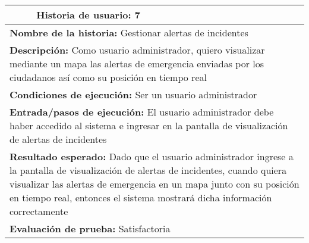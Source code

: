 \begin{longtable}{|p{6.7cm}|p{6.7cm}|}
    \hline
    \endlastfoot
    \multicolumn{1}{|p{6.7cm}|}{\textbf{Número} 7 } & \multicolumn{1}{|p{6.7cm}|}{\textbf{Historia de usuario:} 7}                                                                                                                                                                                                                 \\
    \hline
    \multicolumn{2}{|p{13.4cm}|}{\textbf{Nombre de la historia:} Gestionar alertas de incidentes }                                                                                                                                                                                                                                 \\
    \hline
    \multicolumn{2}{|p{13.4cm}|}{\textbf{Descripción:} Como usuario administrador, quiero visualizar mediante un mapa las alertas de emergencia enviadas por los ciudadanos así como su posición en tiempo real}                                                                                                                   \\
    \hline
    \multicolumn{2}{|p{13.4cm}|}{\textbf{Condiciones de ejecución:} Ser un usuario administrador}                                                                                                                                                                                                                                  \\
    \hline
    \multicolumn{2}{|p{13.4cm}|}{\textbf{Entrada/pasos de ejecución:} El usuario administrador debe haber accedido al sistema e ingresar en la pantalla de visualización de alertas de incidentes}                                                                                                                                 \\
    \hline
    \multicolumn{2}{|p{13.4cm}|}{\textbf{Resultado esperado:} Dado que el usuario administrador ingrese a la pantalla de visualización de alertas de incidentes, cuando quiera visualizar las alertas de emergencia en un mapa junto con su posición en tiempo real, entonces el sistema mostrará dicha información correctamente} \\
    \hline
    \multicolumn{2}{|p{13.4cm}|}{\textbf{Evaluación de prueba:} Satisfactoria}                                                                                                                                                                                                                                                     \\
    \hline
\end{longtable}

